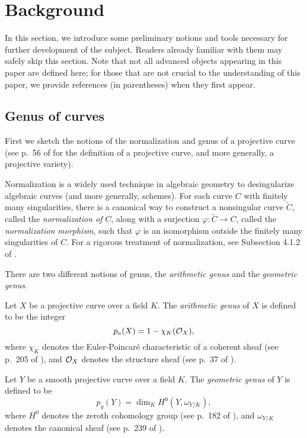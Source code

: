 \section{Background}
\label{sec:pre}

In this section, we introduce some preliminary notions and tools
necessary for further development of the subject. Readers already
familiar with them may safely skip this section. Note that not all
advanced objects appearing in this paper are defined here; for those
that are not crucial to the understanding of this paper, we provide
references (in parentheses) when they first appear.

\subsection{Genus of curves}

First we sketch the notions of the normalization and genus of a
projective curve (see p.~56 of \cite{MR1917232} for the definition of
a projective curve, and more generally, a projective variety).

Normalization is a widely used technique in algebraic geometry to
desingularize algebraic curves (and more generally, schemes). For each
curve $C$ with finitely many singularities, there is a canonical way
to construct a nonsingular curve $\tilde{C}$, called the
\emph{normalization of $C$}, along with a surjection $\varphi:
\tilde{C} \to C$, called the \emph{normalization morphism}, such that
$\varphi$ is an isomorphism outside the finitely many singularities of
$C$. For a rigorous treatment of normalization, see Subsection 4.1.2
of \cite{MR1917232}.

There are two different notions of genus, the \emph{arithmetic genus}
and the \emph{geometric genus}.

\begin{definition}
  Let $X$ be a projective curve over a field $K$. The \emph{arithmetic
    genus} of $X$ is defined to be the integer
  \[
  p_a(X) = 1 - \chi_K(\mathcal{O}_X),
  \]
  where $\chi_K$ denotes the Euler-Poincar\'e characteristic of a
  coherent sheaf (see p.~205 of \cite{MR1917232}), and $\mathcal{O}_X$ denotes
  the structure sheaf (see p.~37 of \cite{MR1917232}).
\end{definition}

\begin{definition}
  Let $Y$ be a smooth projective curve over a field $K$. The
  \emph{geometric genus} of $Y$ is defined to be
  \[
  p_g(Y) = \dim_K H^0(Y, \omega_{Y/K}),
  \]
  where $H^0$ denotes the zeroth cohomology group (see p.~182 of
  \cite{MR1917232}), and $\omega_{Y/K}$ denotes the canonical sheaf
  (see p.~239 of \cite{MR1917232}).
\end{definition}

